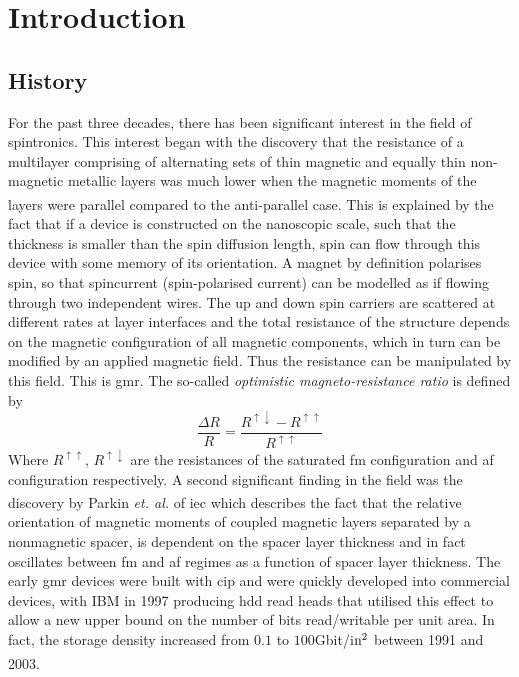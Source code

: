 \documentclass[a4paper, 12pt]{article}
\begin{document}
	\section{Introduction}
	\subsection{History}\label{history}
	For the past three decades, there has been significant interest in the field of spintronics. This interest began with the discovery that the resistance of a multilayer comprising of alternating sets of thin magnetic and equally thin non-magnetic metallic layers was much lower when the magnetic moments of the layers were parallel compared to the anti-parallel case\textcolor{blue}{\textsuperscript{\cite{rev3, GMR1, GMR2}}}. This is explained by the fact that if a device is constructed on the nanoscopic scale, such that the thickness is smaller than the spin diffusion length, spin can flow through this device with some memory of its orientation. A magnet by definition polarises spin, so that spincurrent (spin-polarised current) can be modelled as if flowing through two independent wires. The up and down spin carriers are scattered at different rates at layer interfaces and the total resistance of the structure depends on the magnetic configuration of all magnetic components, which in turn can be modified by an applied magnetic field. Thus the resistance can be manipulated by this field. 
This is \gls{gmr}. The so-called {\it optimistic magneto-resistance ratio} is defined by
	\begin{equation}
		\frac{\Delta R}{R}=\frac{R^{\uparrow \downarrow}-R^{\uparrow\uparrow}}{R^{\uparrow\uparrow}}
	\end{equation}
	Where $R^{\uparrow\uparrow}$, $R^{\uparrow\downarrow}$ are the resistances of the saturated \gls{fm} configuration and \gls{af} configuration respectively. 
	A second significant finding in the field was the discovery by Parkin \textit{et. al.}\textcolor{blue}{\textsuperscript{\cite{Parkin}}} of \gls{iec} 
	which describes the fact that the relative orientation of magnetic moments of coupled magnetic layers separated by a nonmagnetic spacer, is dependent on the spacer layer thickness and in fact oscillates between \gls{fm} and \gls{af} regimes as a function of spacer layer thickness. 
	The early \gls{gmr} devices were built with \gls{cip} and were quickly developed into commercial devices, with IBM in 1997 producing \gls{hdd} read heads that utilised this effect to allow a new upper bound on the number of bits read/writable per unit area. In fact, the storage density increased from $0.1$ to $100$Gbit/i$\rm n^2$ between 1991 and 2003\textcolor{blue}{\textsuperscript{\cite{Mathon2016}}}.  
\end{document}
